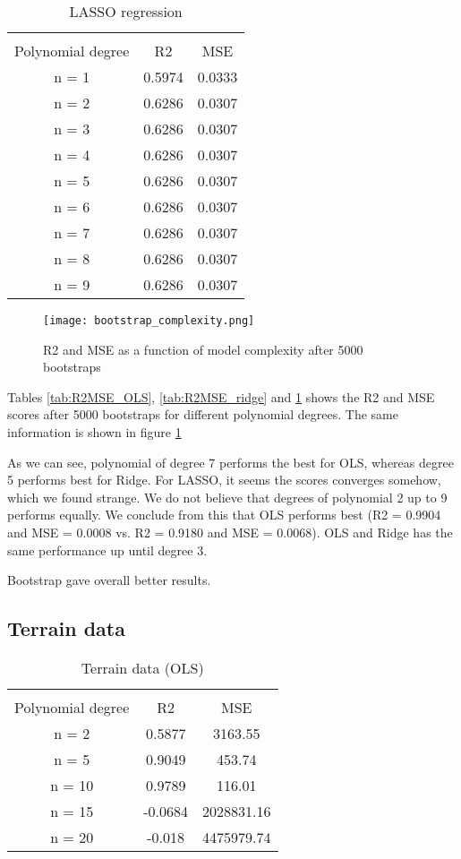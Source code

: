 \documentclass[a4paper]{article}
\begin{document}
 
 \begin{table}[ht]
\caption{LASSO regression}
\begin{center}
\begin{tabular}{ccc}
	\hline
	\multicolumn{3}{c}{}\\
	Polynomial degree&R2&MSE\\
	\hline
	n = 1&0.5974&0.0333\\
	n = 2&0.6286&0.0307\\
	n = 3&0.6286&0.0307\\
	n = 4&0.6286&0.0307\\
	n = 5&0.6286&0.0307\\
	n = 6&0.6286&0.0307\\
	n = 7&0.6286&0.0307\\
	n = 8&0.6286&0.0307\\
	n = 9&0.6286&0.0307\\
\end{tabular}
\end{center}
\label{tab:R2MSE_LASSO}
\end{table}

\begin{figure}[h]
  \texttt{[image: bootstrap\_complexity.png]}
  \caption{R2 and MSE as a function of model complexity after 5000 bootstraps}
  \label{fig:bootstrap_comp}
\end{figure}
 
Tables \ref{tab:R2MSE_OLS}, \ref{tab:R2MSE_ridge} and \ref{tab:R2MSE_LASSO} shows the R2 and MSE scores after 5000 bootstraps for different polynomial degrees. The same information is shown in figure \ref{fig:bootstrap_comp}
 
As we can see, polynomial of degree 7 performs the best for OLS, whereas degree 5 performs best for Ridge. For LASSO, it seems the scores converges somehow, which we found strange. We do not believe that degrees of polynomial 2 up to 9 performs equally.
We conclude from this that OLS performs best (R2 = 0.9904 and MSE = 0.0008 vs. R2 = 0.9180 and MSE = 0.0068). OLS and Ridge has the same performance up until degree 3.

Bootstrap gave overall better results.

\subsection{Terrain data}

\begin{table}[ht]
\caption{Terrain data (OLS)}
\begin{center}
\begin{tabular}{ccc}
	\hline
	\multicolumn{3}{c}{}\\
	Polynomial degree&R2&MSE\\
	\hline
	n = 2&0.5877&3163.55\\
	n = 5&0.9049&453.74\\
	n = 10&0.9789&116.01\\
	n = 15&-0.0684&2028831.16\\
	n = 20&-0.018&4475979.74\\
\end{tabular}
\end{center}
\label{tab:terrainOLS}
\end{table}
\end{document}
